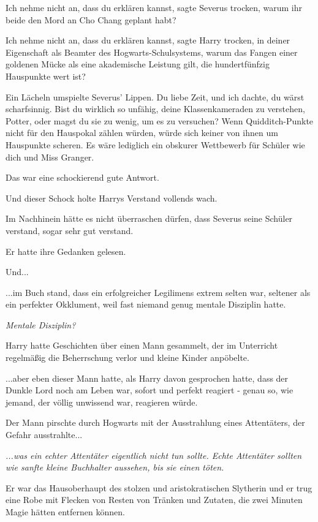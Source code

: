 \glqq{}Ich nehme nicht an, dass du erklären kannst\grqq{}, sagte Severus
trocken, \glqq{}warum ihr beide den Mord an Cho Chang geplant habt?\grqq{}

\glqq{}Ich nehme nicht an, dass du erklären kannst\grqq{}, sagte Harry trocken,
\glqq{}in deiner Eigenschaft als Beamter des Hogwarts-Schulsystems, warum das
Fangen einer goldenen Mücke als eine akademische Leistung gilt, die
hundertfünfzig Hauspunkte wert ist?\grqq{}

Ein Lächeln umspielte Severus' Lippen. \glqq{}Du liebe Zeit, und ich dachte, du
wärst scharfsinnig. Bist du wirklich so unfähig, deine Klassenkameraden zu
verstehen, Potter, oder magst du sie zu wenig, um es zu versuchen? Wenn
Quidditch-Punkte nicht für den Hauspokal zählen würden, würde sich keiner von
ihnen um Hauspunkte scheren. Es wäre lediglich ein obskurer Wettbewerb für
Schüler wie dich und Miss Granger.\grqq{}

Das war eine schockierend gute Antwort.

Und dieser Schock holte Harrys Verstand vollends wach.

Im Nachhinein hätte es nicht überraschen dürfen, dass Severus seine Schüler
verstand, sogar sehr gut verstand.

Er hatte ihre Gedanken gelesen.

Und...

...im Buch stand, dass ein erfolgreicher Legilimens extrem selten war, seltener
als ein perfekter Okklument, weil fast niemand genug mentale Disziplin hatte.

\emph{Mentale Disziplin?}

Harry hatte Geschichten über einen Mann gesammelt, der im Unterricht regelmäßig
die Beherrschung verlor und kleine Kinder anpöbelte.

...aber eben dieser Mann hatte, als Harry davon gesprochen hatte, dass der
Dunkle Lord noch am Leben war, sofort und perfekt reagiert - genau so, wie
jemand, der völlig unwissend war, reagieren würde.

Der Mann pirschte durch Hogwarts mit der Ausstrahlung eines Attentäters, der
Gefahr ausstrahlte...

\emph{...was ein echter Attentäter eigentlich nicht tun sollte. Echte Attentäter
sollten wie sanfte kleine Buchhalter aussehen, bis sie einen töten.}

Er war das Hausoberhaupt des stolzen und aristokratischen Slytherin und er trug
eine Robe mit Flecken von Resten von Tränken und Zutaten, die zwei Minuten Magie
hätten entfernen können.

